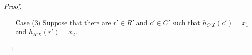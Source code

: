 \begin{proof}
\begin{itemize}
        \item[Case (3)] Suppose that there are $r' \in R'$ and $c' \in C'$ such that $h_{C'X}(c') = x_1$ and $h_{R'X}(r') = x_2$.
        

\end{itemize}
\end{proof}
